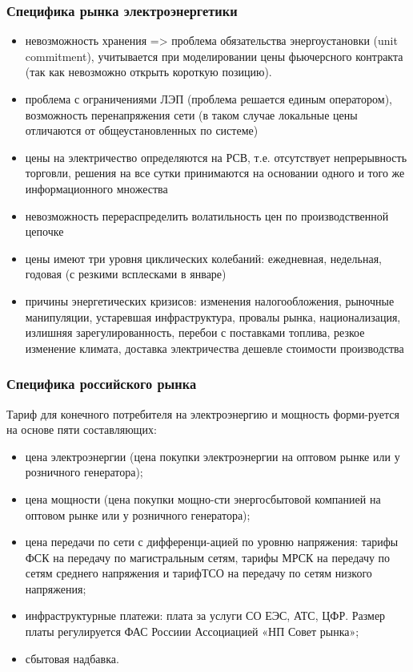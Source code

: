 \documentclass[c, dvipsnames]{beamer}  %
\begin{document}
\begin{frame}[shrink=5]
\frametitle{Специфика рынка электроэнергетики} 

\begin{itemize}
	\item невозможность хранения => проблема обязательства энергоустановки (unit commitment), учитывается при моделировании цены фьючерсного контракта (так как невозможно открыть короткую позицию). 
	\item проблема с ограничениями ЛЭП (проблема решается единым оператором), возможность перенапряжения сети (в таком случае локальные цены отличаются от общеустановленных по системе) 
	\item цены на электричество определяются на РСВ, т.е. отсутствует непрерывность торговли, решения на все сутки принимаются на основании одного и того же информационного множества
	\item невозможность перераспределить волатильность цен по производственной цепочке 
	\item  цены имеют три уровня циклических колебаний: ежедневная, недельная, годовая (с резкими всплесками в январе)
	\item причины энергетических кризисов: изменения налогообложения, рыночные манипуляции, устаревшая инфраструктура, провалы рынка, национализация, излишняя зарегулированность, перебои с поставками топлива, резкое изменение климата,  доставка электричества дешевле стоимости производства 
	
\end{itemize}


\end{frame}


\begin{frame}[shrink=5]
\frametitle{Специфика российского рынка} 

Тариф для конечного потребителя на электроэнергию и мощность форми-руется на основе пяти составляющих:
\begin{itemize}
	\item 
 цена электроэнергии (цена покупки электроэнергии на оптовом рынке или у розничного генератора);
\item  цена мощности (цена покупки мощно-сти энергосбытовой компанией на оптовом рынке или у розничного генератора);
\item  цена передачи по сети с дифференци-ацией по уровню напряжения: тарифы ФСК на передачу по магистральным сетям, тарифы МРСК на передачу по сетям среднего напряжения и тарифТСО на передачу по сетям низкого напряжения;
\item  инфраструктурные платежи: плата за услуги СО ЕЭС, АТС, ЦФР. Размер платы регулируется ФАС Россиии Ассоциацией «НП Совет рынка»;
\item   сбытовая надбавка.

\end{itemize}
\end{frame}
\end{document}
